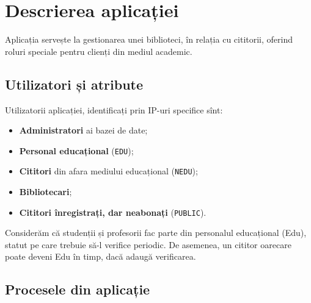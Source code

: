 
\chapter{Descrierea aplicației}

Aplicația servește la gestionarea unei biblioteci, în relația cu cititorii,
oferind roluri speciale pentru clienți din mediul academic.

\section{Utilizatori și atribute}
\label{sec:util-atr}

Utilizatorii aplicației, identificați prin IP-uri specifice sînt:
\begin{itemize}
\item \textbf{Administratori} ai bazei de date;
\item \textbf{Personal educațional} (\texttt{EDU});
\item \textbf{Cititori} din afara mediului educațional (\texttt{NEDU});
\item \textbf{Bibliotecari};
\item \textbf{Cititori înregistrați, dar neabonați} (\texttt{PUBLIC}).
\end{itemize}

Considerăm că studenții și profesorii fac parte din personalul educațional
(Edu), statut pe care trebuie să-l verifice periodic. De asemenea, un
cititor oarecare poate deveni Edu în timp, dacă adaugă verificarea.

\section{Procesele din aplicație}
\label{sec:procese}

